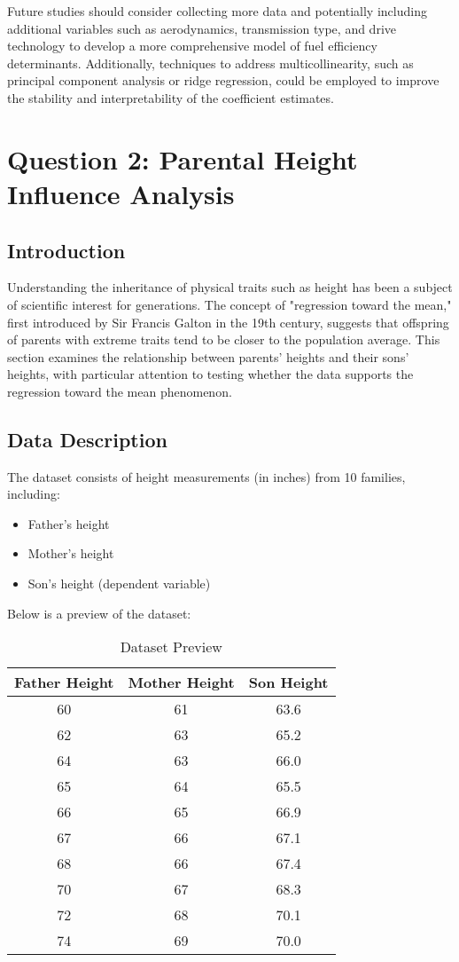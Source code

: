 \documentclass[12pt]{article}
\begin{document}
Future studies should consider collecting more data and potentially including additional variables such as aerodynamics, transmission type, and drive technology to develop a more comprehensive model of fuel efficiency determinants. Additionally, techniques to address multicollinearity, such as principal component analysis or ridge regression, could be employed to improve the stability and interpretability of the coefficient estimates.

\section{Question 2: Parental Height Influence Analysis}

\subsection{Introduction}
Understanding the inheritance of physical traits such as height has been a subject of scientific interest for generations. The concept of "regression toward the mean," first introduced by Sir Francis Galton in the 19th century, suggests that offspring of parents with extreme traits tend to be closer to the population average. This section examines the relationship between parents' heights and their sons' heights, with particular attention to testing whether the data supports the regression toward the mean phenomenon.

\subsection{Data Description}
The dataset consists of height measurements (in inches) from 10 families, including:
\begin{itemize}
    \item Father's height
    \item Mother's height
    \item Son's height (dependent variable)
\end{itemize}

Below is a preview of the dataset:

\begin{table}[H]
\centering
\caption{Dataset Preview}
\begin{tabular}{ccc}
\toprule
Father Height & Mother Height & Son Height \\
\midrule
60 & 61 & 63.6 \\
62 & 63 & 65.2 \\
64 & 63 & 66.0 \\
65 & 64 & 65.5 \\
66 & 65 & 66.9 \\
67 & 66 & 67.1 \\
68 & 66 & 67.4 \\
70 & 67 & 68.3 \\
72 & 68 & 70.1 \\
74 & 69 & 70.0 \\
\bottomrule
\end{tabular}
\end{table}
\end{document}
